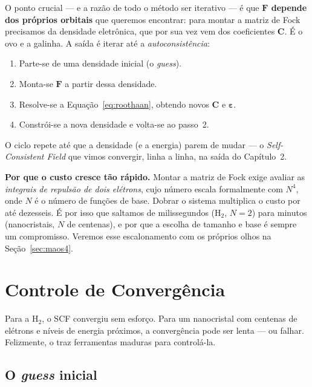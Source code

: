 O ponto crucial --- e a razão de todo o método ser iterativo --- é que
\textbf{$\mathbf{F}$ depende dos próprios orbitais} que queremos encontrar: para
montar a matriz de Fock precisamos da densidade eletrônica, que por sua vez vem
dos coeficientes $\mathbf{C}$. É o ovo e a galinha. A saída é iterar até a
\emph{autoconsistência}:

\begin{enumerate}[leftmargin=*]
  \item Parte-se de uma densidade inicial (o \emph{guess}).
  \item Monta-se $\mathbf{F}$ a partir dessa densidade.
  \item Resolve-se a Equação~\ref{eq:roothaan}, obtendo novos $\mathbf{C}$ e
        $\boldsymbol{\varepsilon}$.
  \item Constrói-se a nova densidade e volta-se ao passo~2.
\end{enumerate}

\noindent
O ciclo repete até que a densidade (e a energia) parem de mudar --- o
\emph{Self-Consistent Field} que vimos convergir, linha a linha, na saída do
Capítulo~2.

\begin{caixanota}
\textbf{Por que o custo cresce tão rápido.} Montar a matriz de Fock exige avaliar
as \emph{integrais de repulsão de dois elétrons}, cujo número escala formalmente
com $N^4$, onde $N$ é o número de funções de base. Dobrar o sistema multiplica o
custo por até dezesseis. É por isso que saltamos de milissegundos (H$_2$, $N=2$)
para minutos (nanocristais, $N$ de centenas), e por que a escolha de tamanho e
base é sempre um compromisso. Veremos esse escalonamento com os próprios olhos na
Seção~\ref{sec:maos4}.
\end{caixanota}

\section{Controle de Convergência}
\label{sec:convergencia}

Para a H$_2$, o SCF convergiu sem esforço. Para um nanocristal com centenas de
elétrons e níveis de energia próximos, a convergência pode ser lenta --- ou
falhar. Felizmente, o \pyscf{} traz ferramentas maduras para controlá-la.

\subsection{O \emph{guess} inicial}

